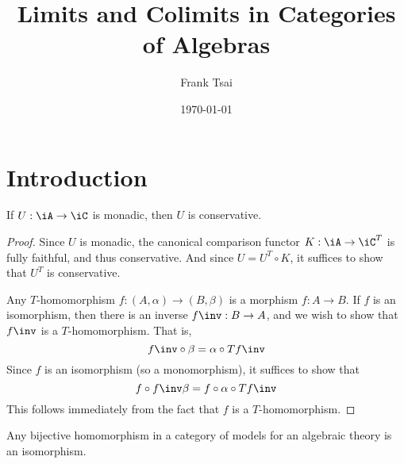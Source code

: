 \documentclass{amsart}
\title{Limits and Colimits in Categories of Algebras}
\author{Frank Tsai}
\date{\today}
\begin{document}
\maketitle
\tableofcontents

\section{Introduction}
\label{sec:introduction}

\begin{lem}
  If $U : \iA \to \iC$ is monadic, then $U$ is conservative.
\end{lem}
\begin{proof}
  Since $U$ is monadic, the canonical comparison functor $K : \iA \to \iC^{T}$ is fully faithful, and thus conservative.
  And since $U = U^{T} \circ K$, it suffices to show that $U^{T}$ is conservative.

  Any $T$-homomorphism $f : (A,\alpha) \to (B,\beta)$ is a morphism $f : A \to B$.
  If $f$ is an isomorphism, then there is an inverse $f\inv : B \to A$, and we wish to show that $f\inv$ is a $T$-homomorphism.
  That is,
  \[
    f\inv \circ \beta = \alpha \circ Tf\inv
  \]
  Since $f$ is an isomorphism (so a monomorphism), it suffices to show that
  \[
    f \circ f\inv \beta = f \circ \alpha \circ Tf\inv
  \]
  This follows immediately from the fact that $f$ is a $T$-homomorphism.
\end{proof}

\begin{cor}
  Any bijective homomorphism in a category of models for an algebraic theory is an isomorphism.
\end{cor}
\end{document}
